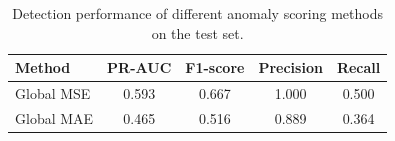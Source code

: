 \begin{table}[H]
\centering
\caption{Detection performance of different anomaly scoring methods on the test set.}
\begin{tabular}{lcccc}
\hline
Method & PR-AUC & F1-score & Precision & Recall \\
\hline
Global MSE & 0.593 & 0.667 & 1.000 & 0.500 \\
Global MAE & 0.465 & 0.516 & 0.889 & 0.364 \\
\hline
\end{tabular}
\label{tab:detection_performance}
\end{table}